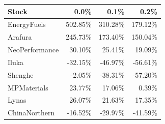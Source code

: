 \begin{tabular}{lrrr} \toprule
Stock & 0.0\% & 0.1\% & 0.2\% \\ \midrule
EnergyFuels & 502.85\% & 310.28\% & 179.12\% \\ 
Arafura & 245.73\% & 173.40\% & 150.04\% \\ 
NeoPerformance & 30.10\% & 25.41\% & 19.09\% \\ 
Iluka & -32.15\% & -46.97\% & -56.61\% \\ 
Shenghe & -2.05\% & -38.31\% & -57.20\% \\ 
MPMaterials & 23.77\% & 17.06\% & 0.39\% \\ 
Lynas & 26.07\% & 21.63\% & 17.35\% \\ 
ChinaNorthern & -16.52\% & -29.97\% & -41.59\% \\ 
\bottomrule \end{tabular}